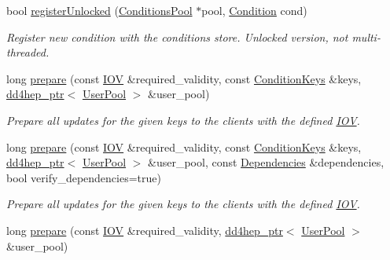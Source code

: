 \begin{DoxyCompactItemize}
bool \hyperlink{class_d_d4hep_1_1_conditions_1_1_conditions_manager_object_a745cd16ef676c16294d450c60617fbd1}{register\+Unlocked} (\hyperlink{class_d_d4hep_1_1_conditions_1_1_conditions_pool}{Conditions\+Pool} $\ast$pool, \hyperlink{class_d_d4hep_1_1_conditions_1_1_condition}{Condition} cond)
\begin{DoxyCompactList}\small\item\em Register new condition with the conditions store. Unlocked version, not multi-\/threaded. \end{DoxyCompactList}\item 
long \hyperlink{class_d_d4hep_1_1_conditions_1_1_conditions_manager_object_a897ca111b081fb1c6ed8a39739684d0e}{prepare} (const \hyperlink{class_d_d4hep_1_1_i_o_v}{I\+OV} \&required\+\_\+validity, const \hyperlink{class_d_d4hep_1_1_conditions_1_1_conditions_manager_object_aad75140018040c6ad49e56a4d56a35ee}{Condition\+Keys} \&keys, \hyperlink{class_d_d4hep_1_1dd4hep__ptr}{dd4hep\+\_\+ptr}$<$ \hyperlink{class_d_d4hep_1_1_conditions_1_1_user_pool}{User\+Pool} $>$ \&user\+\_\+pool)
\begin{DoxyCompactList}\small\item\em Prepare all updates for the given keys to the clients with the defined \hyperlink{class_d_d4hep_1_1_i_o_v}{I\+OV}. \end{DoxyCompactList}\item 
long \hyperlink{class_d_d4hep_1_1_conditions_1_1_conditions_manager_object_a50cd5fe85ead70ca4a0561ca37cbc435}{prepare} (const \hyperlink{class_d_d4hep_1_1_i_o_v}{I\+OV} \&required\+\_\+validity, const \hyperlink{class_d_d4hep_1_1_conditions_1_1_conditions_manager_object_aad75140018040c6ad49e56a4d56a35ee}{Condition\+Keys} \&keys, \hyperlink{class_d_d4hep_1_1dd4hep__ptr}{dd4hep\+\_\+ptr}$<$ \hyperlink{class_d_d4hep_1_1_conditions_1_1_user_pool}{User\+Pool} $>$ \&user\+\_\+pool, const \hyperlink{class_d_d4hep_1_1_conditions_1_1_conditions_manager_object_a539905074db3aee8b401d575649dbdd8}{Dependencies} \&dependencies, bool verify\+\_\+dependencies=true)
\begin{DoxyCompactList}\small\item\em Prepare all updates for the given keys to the clients with the defined \hyperlink{class_d_d4hep_1_1_i_o_v}{I\+OV}. \end{DoxyCompactList}\item 
long \hyperlink{class_d_d4hep_1_1_conditions_1_1_conditions_manager_object_a4550e641d43365715516abc3f82586e6}{prepare} (const \hyperlink{class_d_d4hep_1_1_i_o_v}{I\+OV} \&required\+\_\+validity, \hyperlink{class_d_d4hep_1_1dd4hep__ptr}{dd4hep\+\_\+ptr}$<$ \hyperlink{class_d_d4hep_1_1_conditions_1_1_user_pool}{User\+Pool} $>$ \&user\+\_\+pool)

\end{DoxyCompactItemize}
